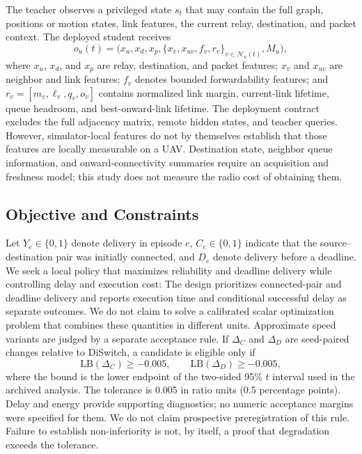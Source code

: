 \documentclass{ieeeaccess}
\newcommand{\DS}{DiSwitch}
\begin{document}
The teacher observes a privileged state $s_t$ that may contain the full graph, positions or motion states, link features, the current relay, destination, and packet context. The deployed student receives
\begin{equation}
o_u(t)=\big(x_u, x_d, x_p, \{x_v,x_{uv},f_v,r_v\}_{v\in\mathcal{N}_u(t)},M_u\big),
\end{equation}
where $x_u$, $x_d$, and $x_p$ are relay, destination, and packet features; $x_v$ and $x_{uv}$ are neighbor and link features; $f_v$ denotes bounded forwardability features; and $r_v=[m_v,\ell_v,q_v,o_v]$ contains normalized link margin, current-link lifetime, queue headroom, and best-onward-link lifetime. The deployment contract excludes the full adjacency matrix, remote hidden states, and teacher queries. However, simulator-local features do not by themselves establish that those features are locally measurable on a UAV. Destination state, neighbor queue information, and onward-connectivity summaries require an acquisition and freshness model; this study does not measure the radio cost of obtaining them.

\subsection{Objective and Constraints}

Let $Y_e\in\{0,1\}$ denote delivery in episode $e$, $C_e\in\{0,1\}$ indicate that the source--destination pair was initially connected, and $D_e$ denote delivery before a deadline. We seek a local policy that maximizes reliability and deadline delivery while controlling delay and execution cost:
The design prioritizes connected-pair and deadline delivery and reports execution time and conditional successful delay as separate outcomes. We do not claim to solve a calibrated scalar optimization problem that combines these quantities in different units. Approximate speed variants are judged by a separate acceptance rule. If $\Delta_C$ and $\Delta_D$ are seed-paired changes relative to \DS{}, a candidate is eligible only if
\begin{equation}
\mathrm{LB}(\Delta_C)\geq-0.005,\qquad
\mathrm{LB}(\Delta_D)\geq-0.005,
\label{eq:gate}
\end{equation}
where the bound is the lower endpoint of the two-sided 95\% $t$ interval used in the archived analysis. The tolerance is 0.005 in ratio units (0.5 percentage points). Delay and energy provide supporting diagnostics; no numeric acceptance margins were specified for them. We do not claim prospective preregistration of this rule. Failure to establish non-inferiority is not, by itself, a proof that degradation exceeds the tolerance.
\end{document}
